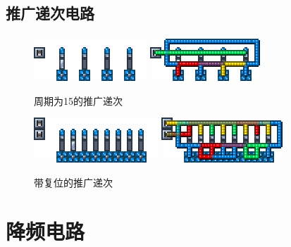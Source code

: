 \subsection{推广递次电路}
\begin{figure}
    \centering
    \includegraphics{images/84.png}
    \qquad
    \includegraphics{images/85.png}
    \caption{周期为15的推广递次}
\end{figure}
\begin{figure}
    \centering
    \includegraphics{images/319.png}
    \qquad
    \includegraphics{images/320.png}
    \caption{带复位的推广递次}
\end{figure}

\section{降频电路}
